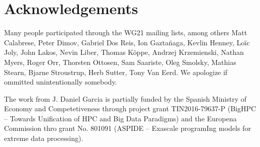 \section*{Acknowledgements}

Many people participated through the WG21 mailing lists, among others
Matt Calabrese,
Peter Dimov,
Gabriel Dos Reis,
Ion Gazta\"{n}aga,
Kevlin Henney,
Lo\"{i}c Joly,
John Lakos, 
Nevin Liber,
Thomas K\"{o}ppe,
Andrzej Krzemienski,
Nathan Myers,
Roger Orr,
Thorsten Ottosen,
Sam Saariste,
Oleg Smolsky,
Mathias Stearn,
Bjarne Stroustrup,
Herb Sutter,
Tony Van Eerd. 
We apologize if ommitted unintentionally somebody.

The work from J. Daniel Garcia is partially funded by
the Spanish Ministry of Economy and Competetiveness through project grant
TIN2016-79637-P (BigHPC -- Towards Unification of HPC and Big Data Paradigms)
and the Europena Commission thro grant
No. 801091 (ASPIDE -- Exascale programIng models for extreme data processing).


